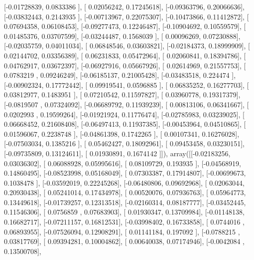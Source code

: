 \documentclass{article}
\begin{document}
       [-0.01728839,  0.0833386 ],
       [ 0.02056242,  0.17245618],
       [-0.09363796,  0.20066636],
       [-0.03832443,  0.2143935 ],
       [-0.00713967,  0.22075307],
       [-0.10473866,  0.11412872],
       [ 0.07694358,  0.06108453],
       [-0.09277473,  0.12246487],
       [-0.10904692,  0.10559579],
       [ 0.01485376,  0.03707599],
       [-0.03244487,  0.1568039 ],
       [ 0.00096269,  0.07230888],
       [-0.02035759,  0.04011034],
       [ 0.06848546,  0.03603821],
       [-0.02184373,  0.18999909],
       [ 0.02144702,  0.03356389],
       [ 0.06231833,  0.05472964],
       [ 0.02060841,  0.18394786],
       [ 0.04762917,  0.03672397],
       [-0.06927916,  0.05667926],
       [ 0.02614969,  0.21557753],
       [ 0.0783219 ,  0.09246249],
       [-0.06185137,  0.21005428],
       [-0.03483518,  0.224474  ],
       [-0.00902324,  0.17772442],
       [ 0.09919541,  0.0596885 ],
       [ 0.06835252,  0.16277703],
       [ 0.03812977,  0.1483951 ],
       [ 0.07210542,  0.11597827],
       [ 0.03960778,  0.19317379],
       [-0.0819507 ,  0.07324092],
       [-0.06689792,  0.11939239],
       [ 0.00813106,  0.06341667],
       [ 0.0202993 ,  0.19599264],
       [-0.01921924,  0.11776474],
       [-0.02785983,  0.03239025],
       [ 0.06668452,  0.21608408],
       [-0.06497413,  0.11937385],
       [-0.00453964,  0.04510865],
       [ 0.01596067,  0.2238748 ],
       [-0.04861398,  0.1742265 ],
       [ 0.00107341,  0.16276028],
       [-0.07503034,  0.1385216 ],
       [ 0.05462427,  0.18092961],
       [ 0.09453458,  0.03230151],
       [-0.09735809,  0.13124611],
       [ 0.01930891,  0.1674142 ]]), array([[-0.02183256,  0.03036302],
       [ 0.06088928,  0.05995616],
       [ 0.08109729,  0.193935  ],
       [-0.04568919,  0.14860495],
       [-0.08523998,  0.05168049],
       [ 0.07303387,  0.17914807],
       [-0.00699673,  0.1038478 ],
       [-0.03592019,  0.22245268],
       [-0.06480806,  0.09692968],
       [ 0.02063044,  0.20930438],
       [ 0.05241014,  0.17434978],
       [ 0.00520076,  0.07936763],
       [ 0.05964773,  0.13449618],
       [-0.01739257,  0.12313518],
       [-0.02160314,  0.08187777],
       [-0.03452445,  0.11546306],
       [ 0.0756859 ,  0.07683903],
       [ 0.01930347,  0.13709984],
       [-0.01148138,  0.16682717],
       [-0.07211157,  0.16812531],
       [-0.03998402,  0.16733858],
       [ 0.0744016 ,  0.06893955],
       [-0.07526094,  0.12908291],
       [ 0.01141184,  0.197092  ],
       [-0.0788215 ,  0.03817769],
       [ 0.09394281,  0.10004862],
       [ 0.00640038,  0.07174946],
       [-0.0042084 ,  0.13500708],
\end{document}

